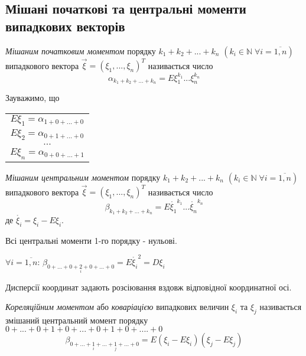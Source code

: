 \subsection{Мішані початкові та центральні 
            моменти випадкових векторів}
\begin{definition}
    \emph{Мішаним початковим моментом} порядку 
    $k_1+k_2+...+k_n$ 
    $\left(k_i \in \mathbb{N} \; \forall i = \overline{1,n}
    \right)$
    випадкового вектора 
    $\vec{\xi} = \left(\xi_1, ..., \xi_n\right)^T$
    називається число
    \begin{equation*}
        \alpha_{k_1+k_2+...+k_n} = 
        E{\xi_1^{k_1}...\xi_n^{k_n}}
    \end{equation*}
\end{definition}
\begin{remark}
    Зауважимо, що
    \begin{center}
        \begin{tabular}{c}
            $E\xi_1 = \alpha_{1+0+...+0}$ \\
            $E\xi_2 = \alpha_{0+1+...+0}$ \\
            $...$ \\
            $E\xi_n = \alpha_{0+0+...+1}$
        \end{tabular}
    \end{center}
\end{remark}
\begin{definition}
    \emph{Мішаним центральним моментом} порядку 
    $k_1+k_2+...+k_n$
    $\left(k_i \in \mathbb{N} \; \forall i = \overline{1,n}
    \right)$ 
    випадкового вектора
    $\vec{\xi} = \left(\xi_1, ..., \xi_n\right)^T$
    називається число
    \begin{equation*}
        \beta_{k_1+k_2+...+k_n} = 
        E{\mathring{\xi_1}^{k_1}
        ...
        \mathring{\xi_n}^{k_n}}
    \end{equation*}
    де $\mathring{\xi_i} = \xi_i - 
    E\xi_i$.
\end{definition}
\begin{remark}
    Всі центральні моменти 1-го порядку - 
    нульові.

    $\forall i = \overline{1,n}$: 
    $\beta_{0+...+0+\underset{i}{2}
    +0+...+0} = E\mathring{\xi_i}^2 = 
    D\xi_i$
\end{remark}

Дисперсії координат задають розсіювання 
вздовж відповідної координатної осі.

\begin{definition}
    \emph{Кореляційним моментом} або 
    \emph{коваріацією} випадкових величин 
    $\xi_i$ та $\xi_j$ називається змішаний 
    центральний момент 
    порядку
    $0+...+0+1+0+...+0+1+0+....+0$ 
    \begin{equation*}
        \beta_{0+...+\underset{i}{1}+...
        +\underset{j}{1}+...+0}
        =
        E(\xi_i-E\xi_i)(\xi_j-E\xi_j)
    \end{equation*}
\end{definition}

